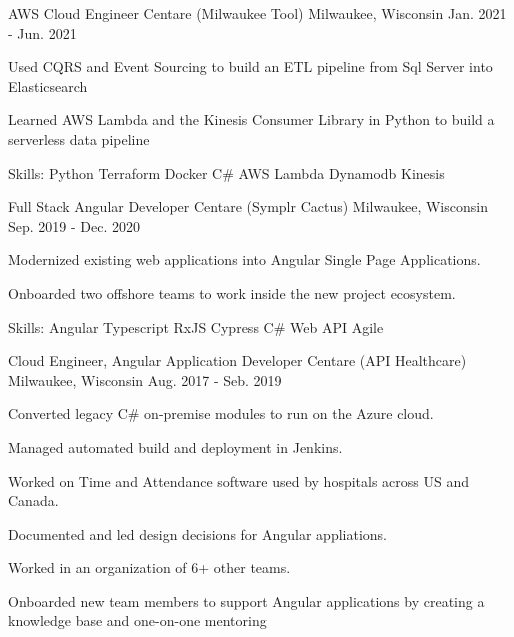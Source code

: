 \begin{cventries}
  \cventry
    {AWS Cloud Engineer} %
    {Centare (Milwaukee Tool)} %
    {Milwaukee, Wisconsin} %
    {Jan. 2021 - Jun. 2021} %
    {
      \begin{cvitems} %
        \item {Used CQRS and Event Sourcing to build an ETL pipeline from Sql Server into Elasticsearch}
        \item {Learned AWS Lambda and the Kinesis Consumer Library in Python to build a serverless data pipeline}
        \item {Skills: Python \textbullet{} Terraform \textbullet{} Docker \textbullet{} C\# \textbullet{} AWS Lambda \textbullet{} Dynamodb \textbullet{} Kinesis}
      \end{cvitems}
    }

  \cventry
    {Full Stack Angular Developer} %
    {Centare (Symplr Cactus)} %
    {Milwaukee, Wisconsin} %
    {Sep. 2019 - Dec. 2020} %
    {
      \begin{cvitems} %
        \item {Modernized existing web applications into Angular Single Page Applications.}
        \item {Onboarded two offshore teams to work inside the new project ecosystem.}
        \item {Skills: Angular \textbullet{} Typescript \textbullet{} RxJS \textbullet{} Cypress \textbullet{} C\# Web API \textbullet{} Agile}
      \end{cvitems}
    }

  \cventry
    {Cloud Engineer, Angular Application Developer} %
    {Centare (API Healthcare)} %
    {Milwaukee, Wisconsin} %
    {Aug. 2017 - Seb. 2019} %
    {
      \begin{cvitems} %
        \item {Converted legacy C\# on-premise modules to run on the Azure cloud.}
        \item {Managed automated build and deployment in Jenkins.}
        \item {Worked on Time and Attendance software used by hospitals across US and Canada.}
        \item {Documented and led design decisions for Angular appliations.}
        \item {Worked in an organization of 6+ other teams.}
        \item {Onboarded new team members to support Angular applications by creating a knowledge base and one-on-one mentoring}
      \end{cvitems}
    }


\end{cventries}
